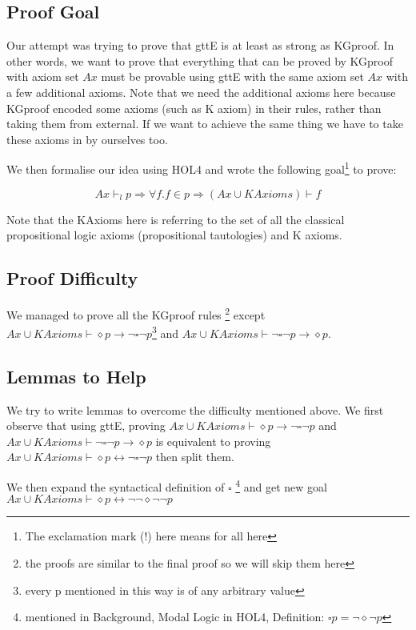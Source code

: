 \documentclass[submission,copyright,creativecommons]{eptcs}
\begin{document}
\subsection{Proof Goal}

Our attempt was trying to prove that gttE is at least as strong as KGproof.
In other words, we want to prove that everything that can be proved by KGproof with axiom set $Ax$
must be provable using gttE with the same axiom set $Ax$ with a few additional axioms.
Note that we need the additional axioms here because KGproof encoded some axioms (such as K axiom) 
in their rules, rather than taking them from external. If we want to achieve the same 
thing we have to take these axioms in by ourselves too. 

We then formalise our idea using HOL4 and wrote the following goal\footnote{The exclamation mark (!) here means for all here} to prove:


$$Ax \vdash_l p \Rightarrow \forall f. f \in p \Rightarrow (Ax\cup KAxioms) \vdash f$$

Note that the KAxioms here is referring to the set of all the classical propositional 
logic axioms (propositional tautologies) and K axioms. 

\subsection{Proof Difficulty}
\label{difficulty}
We managed to prove all the KGproof rules
\footnote{the proofs are similar to the final proof so we will skip them here} 
except $Ax \cup KAxioms \vdash \diamond p \rightarrow \neg \square \neg p$\footnote{every p mentioned 
in this way is of any arbitrary value} and 
$Ax \cup KAxioms \vdash \neg \square \neg p \rightarrow \diamond p$. 


\subsection{Lemmas to Help} 
We try to write lemmas to overcome the difficulty mentioned above.
We first observe that using gttE, proving $Ax \cup KAxioms \vdash \diamond p \rightarrow \neg \square \neg p$ and 
$Ax \cup KAxioms \vdash \neg \square \neg p \rightarrow \diamond p$ is equivalent to 
proving $Ax \cup KAxioms \vdash \diamond p \leftrightarrow \neg \square \neg p$ then split them.

We then expand the syntactical definition of $\square$ 
\footnote{mentioned in Background, Modal Logic in HOL4, Definition: $\square p = \neg \diamond \neg p $} and 
get new goal $Ax \cup KAxioms \vdash \diamond p \leftrightarrow \neg \neg \diamond \neg \neg p$ 
\end{document}
